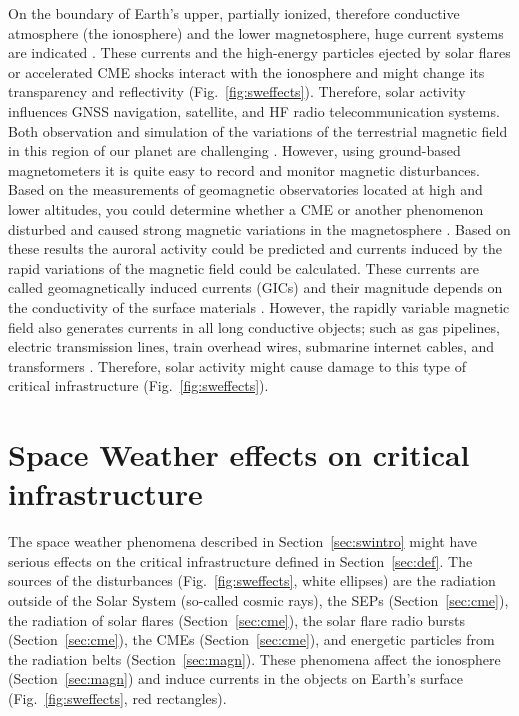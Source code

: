 \documentclass[sn-aps]{sn-jnl}%
\begin{document}
On the boundary of Earth's upper, partially ionized, therefore conductive atmosphere (the ionosphere) and the lower magnetosphere, huge current systems are indicated \cite{juusola14:_statis_gumic_mhd}. These currents and the high-energy particles ejected by solar flares or accelerated CME shocks interact with the ionosphere and might change its transparency and reflectivity (Fig.~\ref{fig:sweffects}). Therefore, solar activity influences GNSS navigation, satellite, and HF radio telecommunication systems\cite{scherer05:_space_weath}. Both observation and simulation of the variations of the terrestrial magnetic field in this region of our planet are challenging \cite{facsko16:_one_earth}. However, using ground-based magnetometers it is quite easy to record and monitor magnetic disturbances. Based on the measurements of geomagnetic observatories located at high and lower altitudes, you could determine whether a CME or another phenomenon disturbed and caused strong magnetic variations in the magnetosphere \cite{scherer05:_space_weath}. Based on these results the auroral activity could be predicted and currents induced by the rapid variations of the magnetic field could be calculated. These currents are called geomagnetically induced currents (GICs) and their magnitude depends on the conductivity of the surface materials \cite{scherer05:_space_weath}. However, the rapidly variable magnetic field also generates currents in all long conductive objects; such as gas pipelines, electric transmission lines, train overhead wires, submarine internet cables, and transformers \cite{scherer05:_space_weath}. Therefore, solar activity might cause damage to this type of critical infrastructure (Fig.~\ref{fig:sweffects}).

\section{Space Weather effects on critical infrastructure}
\label{sec:sweci}

The space weather phenomena described in Section~\ref{sec:swintro} might have serious effects on the critical infrastructure defined in Section~\ref{sec:def}. The sources of the disturbances (Fig.~\ref{fig:sweffects}, white ellipses) are the radiation outside of the Solar System (so-called cosmic rays), the SEPs (Section~\ref{sec:cme}), the radiation of solar flares (Section~\ref{sec:cme}), the solar flare radio bursts (Section~\ref{sec:cme}), the CMEs (Section~\ref{sec:cme}), and energetic particles from the radiation belts (Section~\ref{sec:magn}). These phenomena affect the ionosphere (Section~\ref{sec:magn}) and induce currents in the objects on Earth's surface (Fig.~\ref{fig:sweffects}, red rectangles). 
\end{document}

